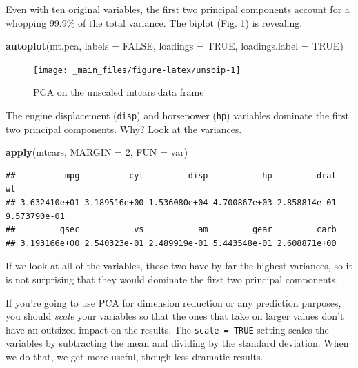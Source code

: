 \documentclass[
]{book}
\newenvironment{Shaded}{\begin{snugshade}}{\end{snugshade}}
\newcommand{\AttributeTok}[1]{\textcolor[rgb]{0.13,0.29,0.53}{#1}}
\newcommand{\ConstantTok}[1]{\textcolor[rgb]{0.56,0.35,0.01}{#1}}
\newcommand{\DecValTok}[1]{\textcolor[rgb]{0.00,0.00,0.81}{#1}}
\newcommand{\FunctionTok}[1]{\textcolor[rgb]{0.13,0.29,0.53}{\textbf{#1}}}
\newcommand{\NormalTok}[1]{#1}
\theoremstyle{definition}
\theoremstyle{definition}
\theoremstyle{definition}
\theoremstyle{definition}
\theoremstyle{remark}
\begin{document}
Even with ten original variables, the first two principal components account for a whopping 99.9\% of the total variance. The biplot (Fig. \ref{fig:unsbip}) is revealing.

\begin{Shaded}
\begin{Highlighting}[]
\FunctionTok{autoplot}\NormalTok{(mt.pca, }\AttributeTok{labels =} \ConstantTok{FALSE}\NormalTok{,}
          \AttributeTok{loadings =} \ConstantTok{TRUE}\NormalTok{,}
          \AttributeTok{loadings.label =} \ConstantTok{TRUE}\NormalTok{)}
\end{Highlighting}
\end{Shaded}

\begin{figure}

{\centering \texttt{[image: \_main\_files/figure-latex/unsbip-1]} 

}

\caption{PCA on the unscaled mtcars data frame}\label{fig:unsbip}
\end{figure}

The engine displacement (\texttt{disp}) and horsepower (\texttt{hp}) variables dominate the first two principal components. Why? Look at the variances.

\begin{Shaded}
\begin{Highlighting}[]
\FunctionTok{apply}\NormalTok{(mtcars, }\AttributeTok{MARGIN =} \DecValTok{2}\NormalTok{, }\AttributeTok{FUN =}\NormalTok{ var)}
\end{Highlighting}
\end{Shaded}

\begin{verbatim}
##          mpg          cyl         disp           hp         drat           wt 
## 3.632410e+01 3.189516e+00 1.536080e+04 4.700867e+03 2.858814e-01 9.573790e-01 
##         qsec           vs           am         gear         carb 
## 3.193166e+00 2.540323e-01 2.489919e-01 5.443548e-01 2.608871e+00
\end{verbatim}

If we look at all of the variables, those two have by far the highest variances, so it is not surprising that they would dominate the first two principal components.

\begin{notebox}
If you're going to use PCA for dimension reduction or any prediction purposes, you should \emph{scale} your variables so that the ones that take on larger values don't have an outsized impact on the results. The \texttt{scale\ =\ TRUE} setting scales the variables by subtracting the mean and dividing by the standard deviation. When we do that, we get more useful, though less dramatic results.

\end{notebox}
\end{document}
